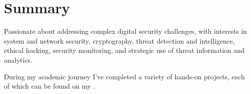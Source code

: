 \section{Summary}


    \begin{onecolentry}
        Passionate about addressing complex digital security challenges, with interests in system and network security, cryptography, threat detection and intelligence, ethical hacking, security monitoring, and strategic use of threat information and analytics.
    \end{onecolentry}

    \vspace{0.1 cm} %

    \begin{onecolentry}
        During my academic journey I've completed a variety of hands-on projects, each of which can be found on my \hspace{0em} \mbox{}.
    \end{onecolentry}
